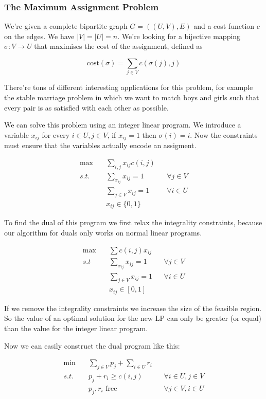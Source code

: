 \subsubsection{The Maximum Assignment Problem}\label{sec:maxAssignment}

We're given a complete bipartite graph $G=((U,V),E)$ and a cost function $c$ on the edges. We have $|V|=|U|=n$. We're looking for a bijective mapping $\sigma : V \rightarrow U$ that maximises the cost of the assignment, defined as 

\[\text{cost}(\sigma) = \sum_{j\in V} c(\sigma(j),j)\]

There're tons of different interesting applications for this problem, for example the stable marriage problem in which we want to match boys and girls such that every pair is as satisfied with each other as possible.

We can solve this problem using an integer linear program. We introduce a variable $x_{ij}$ for every $i\in U,j\in V$, if $x_{ij}=1$ then $\sigma(i)=i$. Now the constraints must ensure that the variables actually encode an assigment.

\begin{align*}
\max \quad &  \sum_{i,j} x_{ij} c(i,j)\\
s.t. & \sum_{x_{ij}} x_{ij}=1 && \forall j\in V \\
&\sum_{j\in V} x_{ij} = 1 && \forall i\in U\\
&x_{ij}\in \{0,1\}
\end{align*}

To find the dual of this program we first relax the integrality constraints, because our algorithm for duals only works on normal linear programs.

\begin{align*}
\max \quad & \sum c(i,j)x_{ij}\\
s.t & \sum_{x_{ij}} x_{ij}=1 && \forall j\in V \\
	&\sum_{j\in V} x_{ij} = 1 && \forall i\in U\\
	&x_{ij} \in [0,1]
\end{align*}

If we remove the integrality constraints we increase the size of the feasible region. So the value of an optimal solution for the new LP can only be greater (or equal) than the value for the integer linear program. %

Now we can easily construct the dual program like this:

\begin{align*}
\min \quad & \sum_{j\in V} p_j + \sum_{i\in U} r_i\\
s.t.\quad & p_j+r_i\geq c(i,j) &&\forall i\in U, j\in V\\
& p_j,r_i \text{ free} &&\forall j\in V,i\in U
\end{align*}

